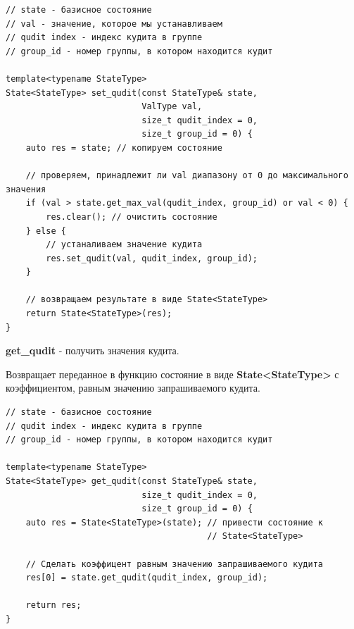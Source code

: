 \documentclass[12pt,fleqn]{article}
\begin{document}
\begin{mdframed}[linecolor=black, topline=true, bottomline=true,
leftline=false, rightline=false]
\begin{verbatim}
// state - базисное состояние
// val - значение, которое мы устанавливаем
// qudit index - индекс кудита в группе
// group_id - номер группы, в котором находится кудит

template<typename StateType>
State<StateType> set_qudit(const StateType& state,
                           ValType val,
                           size_t qudit_index = 0,
                           size_t group_id = 0) {
    auto res = state; // копируем состояние

    // проверяем, принадлежит ли val диапазону от 0 до максимального значения
    if (val > state.get_max_val(qudit_index, group_id) or val < 0) {
        res.clear(); // очистить состояние
    } else {
        // устаналиваем значение кудита
        res.set_qudit(val, qudit_index, group_id);
    }

    // возвращаем результате в виде State<StateType>
    return State<StateType>(res);
}
\end{verbatim}
\end{mdframed}

        \begin{center}
            \textbf{get\_qudit} - получить значения кудита.
        \end{center}

        Возвращает переданное в функцию состояние в виде \textbf{State<StateType>} с коэффициентом, равным значению запрашиваемого кудита.

\begin{mdframed}[linecolor=black, topline=true, bottomline=true,
leftline=false, rightline=false]
\begin{verbatim}
// state - базисное состояние
// qudit index - индекс кудита в группе
// group_id - номер группы, в котором находится кудит

template<typename StateType>
State<StateType> get_qudit(const StateType& state,
                           size_t qudit_index = 0,
                           size_t group_id = 0) {
    auto res = State<StateType>(state); // привести состояние к
                                        // State<StateType>

    // Сделать коэффицент равным значению запрашиваемого кудита
    res[0] = state.get_qudit(qudit_index, group_id);

    return res;
}
\end{verbatim}
\end{mdframed}
\end{document}
